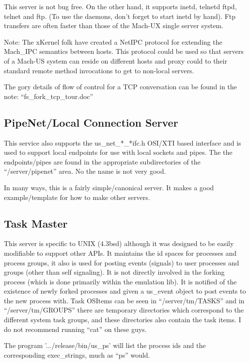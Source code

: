 This server is not bug free.  On the other hand, it supports inetd, telnetd
ftpd, telnet and ftp. (To use the daemons, don't forget to start inetd by hand).
Ftp transfers are often faster than those of the Mach-UX single server system.

Note:  The xKernel folk have created a NetIPC protocol for extending the
Mach\_IPC semantics between hosts.  This protocol could be used so that
servers of a Mach-US system can reside on different hosts and proxy could
to their standard remote method invocations to get to non-local servers.

The gory details of flow of control for a TCP conversation can be found in
the note: ``fs\_fork\_tcp\_tour.doc''

\subsection{PipeNet/Local Connection Server}
This service also supports the us\_net\_*\_*ifc.h OSI/XTI based interface
and is used to support local endpoints for use with local sockets and pipes.
The the endpoints/pipes are found in the appropriate subdirectories of
the ``/server/pipenet'' area.  No the name is not very good.

In many ways, this is a fairly simple/canonical server.  It makes a
good example/template for how to make other servers.

\subsection{Task Master}
This server is specific to UNIX (4.3bsd) although it was designed to be easily
modifiable to support other APIs.  It maintains the id spaces for
processes and process groups, it also is used for posting events (signals)
to user processes and groups (other than self signaling).  It is not
directly involved in the forking process (which is done primarily within
the emulation lib).  It is notified of the existence of newly forked
processes and given a us\_event object to post events to the new process
with.  Task OSItems can be seen in ``/server/tm/TASKS'' and in
``/server/tm/GROUPS'' there are temporary directories which correspond
to the different system task groups, and these directories also contain
the task items.  I do not recommend running ``cat'' on these guys.

The program '.../release/bin/us\_ps' will list the process ids and the
corresponding exec\_strings, much as ``ps'' would.

